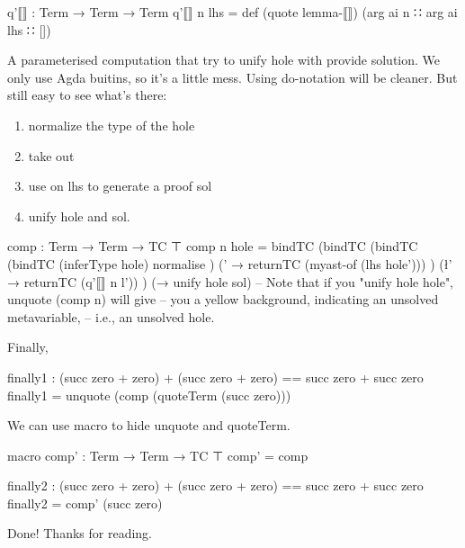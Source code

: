 \documentclass{article}
\begin{document}
\begin{code}
q'⟦⟧ : Term → Term → Term
q'⟦⟧ n lhs = def (quote lemma-⟦⟧) (arg ai n ∷ arg ai lhs ∷ [])
\end{code}

A parameterised  computation that try to unify hole with provide solution. We only use Agda buitins, so it's a little mess. Using do-notation will be cleaner. But still easy to see what's there:

\begin{enumerate}
  \item normalize the type of the hole
  \item take out 
  \item use  on lhs to generate a proof sol
  \item unify hole and sol.
\end{enumerate}

\begin{code}
comp : Term → Term → TC ⊤
comp n hole =
  bindTC
    (bindTC
      (bindTC 
        (bindTC
          (inferType hole)
          normalise
        )
        (\hole' → returnTC (myast-of (lhs hole')))
      )
      (\l' →  returnTC (q'⟦⟧ n l'))
    )
    (\sol → unify hole sol)
  -- Note that if you "unify hole hole", unquote (comp n) will give
  -- you a yellow background, indicating an unsolved metavariable,
  -- i.e., an unsolved hole.
\end{code}

Finally,

\begin{code}
finally1 : (succ zero + zero) + (succ zero + zero) == succ zero + succ zero
finally1 = unquote (comp (quoteTerm (succ zero)))
\end{code}

We can use macro to hide unquote and quoteTerm.

\begin{code}
macro
  comp' : Term → Term → TC ⊤
  comp' = comp

finally2 : (succ zero + zero) + (succ zero + zero) == succ zero + succ zero
finally2 = comp' (succ zero)
\end{code}

Done! Thanks for reading.
\end{document}
